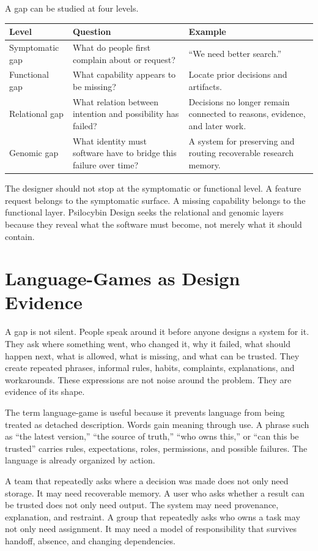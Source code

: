 \documentclass[11pt]{article}
\begin{document}
A gap can be studied at four levels.

\begin{longtable}{|p{}|p{}|p{}|}
\hline
\textbf{Level} & \textbf{Question} & \textbf{Example} \\
\hline
Symptomatic gap & What do people first complain about or request? & ``We need better search.'' \\
\hline
Functional gap & What capability appears to be missing? & Locate prior decisions and artifacts. \\
\hline
Relational gap & What relation between intention and possibility has failed? & Decisions no longer remain connected to reasons, evidence, and later work. \\
\hline
Genomic gap & What identity must software have to bridge this failure over time? & A system for preserving and routing recoverable research memory. \\
\hline
\end{longtable}

The designer should not stop at the symptomatic or functional level. A feature request belongs to the symptomatic surface. A missing capability belongs to the functional layer. Psilocybin Design seeks the relational and genomic layers because they reveal what the software must become, not merely what it should contain.

\section{Language-Games as Design Evidence}

A gap is not silent. People speak around it before anyone designs a system for it. They ask where something went, who changed it, why it failed, what should happen next, what is allowed, what is missing, and what can be trusted. They create repeated phrases, informal rules, habits, complaints, explanations, and workarounds. These expressions are not noise around the problem. They are evidence of its shape.

The term language-game is useful because it prevents language from being treated as detached description. Words gain meaning through use. A phrase such as ``the latest version,'' ``the source of truth,'' ``who owns this,'' or ``can this be trusted'' carries rules, expectations, roles, permissions, and possible failures. The language is already organized by action.

A team that repeatedly asks where a decision was made does not only need storage. It may need recoverable memory. A user who asks whether a result can be trusted does not only need output. The system may need provenance, explanation, and restraint. A group that repeatedly asks who owns a task may not only need assignment. It may need a model of responsibility that survives handoff, absence, and changing dependencies.
\end{document}

